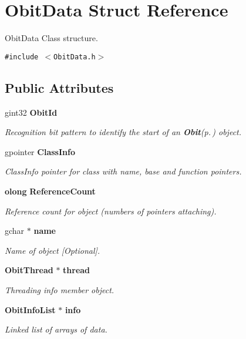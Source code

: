 \section{Obit\-Data Struct Reference}
\label{structObitData}
Obit\-Data Class structure.  


{\tt \#include $<$Obit\-Data.h$>$}

\subsection*{Public Attributes}
\begin{CompactItemize}
\item 
gint32 {\bf Obit\-Id}
\begin{CompactList}\small\item\em Recognition bit pattern to identify the start of an {\bf Obit}{\rm (p.\,\pageref{structObit})} object. \item\end{CompactList}\item 
gpointer {\bf Class\-Info}
\begin{CompactList}\small\item\em Class\-Info pointer for class with name, base and function pointers. \item\end{CompactList}\item 
{\bf olong} {\bf Reference\-Count}
\begin{CompactList}\small\item\em Reference count for object (numbers of pointers attaching). \item\end{CompactList}\item 
gchar $\ast$ {\bf name}
\begin{CompactList}\small\item\em Name of object [Optional]. \item\end{CompactList}\item 
{\bf Obit\-Thread} $\ast$ {\bf thread}
\begin{CompactList}\small\item\em Threading info member object. \item\end{CompactList}\item 
{\bf Obit\-Info\-List} $\ast$ {\bf info}
\begin{CompactList}\small\item\em Linked list of arrays of data. \item\end{CompactList}\item 

\end{CompactItemize}
